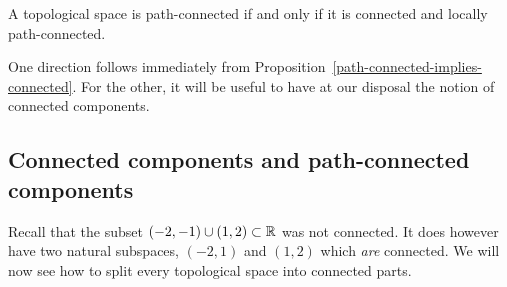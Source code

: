 \begin{thm}
  \label{path-connected-vs-connected}
  A topological space is path-connected if and only if it is connected and locally path-connected.
\end{thm}
One direction follows immediately from Proposition~\ref{path-connected-implies-connected}. For the other, it will be useful to have at our disposal the notion of connected components.

\subsection{Connected components and path-connected components}
Recall that the subset $(-2,-1) \cup (1,2) \subset \mathbb{R}$ was not connected. It does however have two natural subspaces, $(-2,1)$ and $(1,2)$ which \emph{are} connected. We will now see how to split every topological space into connected parts.

